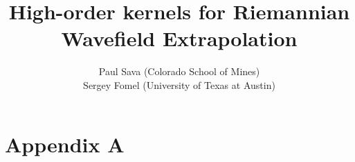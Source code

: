 \title{High-order kernels for Riemannian Wavefield Extrapolation}
\author{Paul Sava (Colorado School of Mines) \\
        Sergey Fomel (University of Texas at Austin)}

\maketitle













\appendix
\section{Appendix A}




